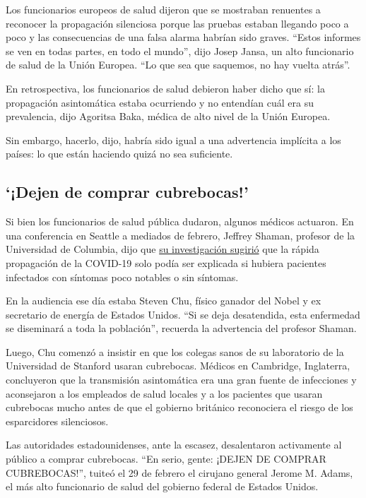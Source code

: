 Los funcionarios europeos de salud dijeron que se mostraban renuentes a
reconocer la propagación silenciosa porque las pruebas estaban llegando
poco a poco y las consecuencias de una falsa alarma habrían sido graves.
``Estos informes se ven en todas partes, en todo el mundo'', dijo Josep
Jansa, un alto funcionario de salud de la Unión Europea. ``Lo que sea
que saquemos, no hay vuelta atrás''.

En retrospectiva, los funcionarios de salud debieron haber dicho que sí:
la propagación asintomática estaba ocurriendo y no entendían cuál era su
prevalencia, dijo Agoritsa Baka, médica de alto nivel de la Unión
Europea.

Sin embargo, hacerlo, dijo, habría sido igual a una advertencia
implícita a los países: lo que están haciendo quizá no sea suficiente.

\hypertarget{dejen-de-comprar-cubrebocas}{%
\subsection{`¡Dejen de comprar
cubrebocas!'}\label{dejen-de-comprar-cubrebocas}}

Si bien los funcionarios de salud pública dudaron, algunos médicos
actuaron. En una conferencia en Seattle a mediados de febrero, Jeffrey
Shaman, profesor de la Universidad de Columbia, dijo que
\href{https://science.sciencemag.org/content/368/6490/489}{su
investigación sugirió} que la rápida propagación de la COVID-19 solo
podía ser explicada si hubiera pacientes infectados con síntomas poco
notables o sin síntomas.

En la audiencia ese día estaba Steven Chu, físico ganador del Nobel y ex
secretario de energía de Estados Unidos. ``Si se deja desatendida, esta
enfermedad se diseminará a toda la población'', recuerda la advertencia
del profesor Shaman.

Luego, Chu comenzó a insistir en que los colegas sanos de su laboratorio
de la Universidad de Stanford usaran cubrebocas. Médicos en Cambridge,
Inglaterra, concluyeron que la transmisión asintomática era una gran
fuente de infecciones y aconsejaron a los empleados de salud locales y a
los pacientes que usaran cubrebocas mucho antes de que el gobierno
británico reconociera el riesgo de los esparcidores silenciosos.

Las autoridades estadounidenses, ante la escasez, desalentaron
activamente al público a comprar cubrebocas. ``En serio, gente: ¡DEJEN
DE COMPRAR CUBREBOCAS!'', tuiteó el 29 de febrero el cirujano general
Jerome M. Adams, el más alto funcionario de salud del gobierno federal
de Estados Unidos.

